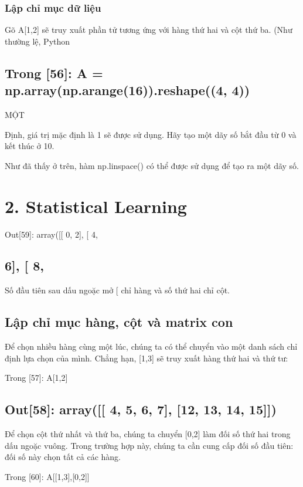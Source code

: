 \subsubsection{Lập chỉ mục dữ liệu}

Gõ A[1,2] sẽ truy xuất phần tử tương ứng với hàng thứ hai và cột thứ ba. (Như thường lệ, Python

\subsection{Trong [56]: A = np.array(np.arange(16)).reshape((4, 4))}

MỘT

Định, giá trị mặc định là 1 sẽ được sử dụng. Hãy tạo một dãy số bắt đầu từ 0 và kết thúc ở 10.

Như đã thấy ở trên, hàm np.linspace() có thể được sử dụng để tạo ra một dãy số.

\section{2. Statistical Learning}

Out[59]: array([[ 0, 2], [ 4,

\subsection{6], [ 8,}

Số đầu tiên sau dấu ngoặc mở [ chỉ hàng và số thứ hai chỉ cột.

\subsection{Lập chỉ mục hàng, cột và matrix con}

Để chọn nhiều hàng cùng một lúc, chúng ta có thể chuyển vào một danh sách chỉ định lựa chọn của mình. Chẳng hạn, [1,3] sẽ truy xuất hàng thứ hai và thứ tư:

Trong [57]: A[1,2]

\subsection{Out[58]: array([[ 4, 5, 6, 7], [12, 13, 14, 15]])}

Để chọn cột thứ nhất và thứ ba, chúng ta chuyển [0,2] làm đối số thứ hai trong dấu ngoặc vuông. Trong trường hợp này, chúng ta cần cung cấp đối số đầu tiên: đối số này chọn tất cả các hàng.

Trong [60]: A[[1,3],[0,2]]


